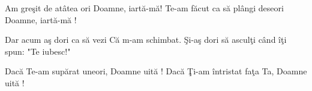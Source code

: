 
\beginverse
Am greşit de atâtea ori
Doamne, iartă-mă!
Te-am făcut ca să plângi deseori
Doamne, iartă-mă !
\endverse

\beginchorus
Dar acum aş dori ca să vezi
Că m-am schimbat.
Şi-aş dori să asculţi când îţi spun:
"Te iubesc!"
\endchorus

\beginverse
Dacă Te-am supărat uneori,
Doamne uită !
Dacă Ţi-am întristat faţa Ta,
Doamne uită !
\endverse

\endsong